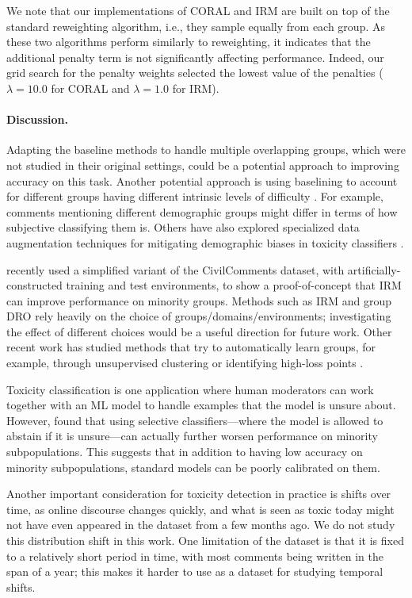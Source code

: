 We note that our implementations of CORAL and IRM are built on top of the standard reweighting algorithm, i.e., they sample equally from each group. As these two algorithms perform similarly to
reweighting, it indicates that the additional penalty term is not significantly affecting performance.
Indeed, our grid search for the penalty weights selected the lowest value of the penalties ($\lambda=10.0$ for CORAL and $\lambda=1.0$ for IRM).

\paragraph{Discussion.}
Adapting the baseline methods to handle multiple overlapping groups, which were not studied in their original settings, could be a potential approach to improving accuracy on this task.
Another potential approach is using baselining to account for different groups having different intrinsic levels of difficulty \citep{oren2019drolm}.
For example, comments mentioning different demographic groups might differ in terms of how subjective classifying them is.
Others have also explored specialized data augmentation techniques for mitigating demographic biases in toxicity classifiers \citep{zhao2018gender}.

\citet{adragna2020fairness} recently used a simplified variant of the CivilComments dataset, with artificially-constructed training and test environments, to show a proof-of-concept that IRM can improve performance on minority groups. Methods such as IRM and group DRO rely heavily on the choice of groups/domains/environments; investigating the effect of different choices would be a useful direction for future work.
Other recent work has studied methods that try to automatically learn groups, for example, through unsupervised clustering \citep{oren2019drolm,sohoni2020subclass}
or identifying high-loss points \citep{nam2020learning,liu2021jtt}.

Toxicity classification is one application where human moderators can work together with an ML model to handle examples that the model is unsure about. However, \citet{jones2021selective} found that using selective classifiers---where the model is allowed to abstain if it is unsure---can actually further worsen performance on minority subpopulations. This suggests that in addition to having low accuracy on minority subpopulations, standard models can be poorly calibrated on them.

Another important consideration for toxicity detection in practice is shifts over time, as online discourse changes quickly, and what is seen as toxic today might not have even appeared in the dataset from a few months ago. We do not study this distribution shift in this work. One limitation of the \CivilComments dataset is that it is fixed to a relatively short period in time, with most comments being written in the span of a year; this makes it harder to use as a dataset for studying temporal shifts.

